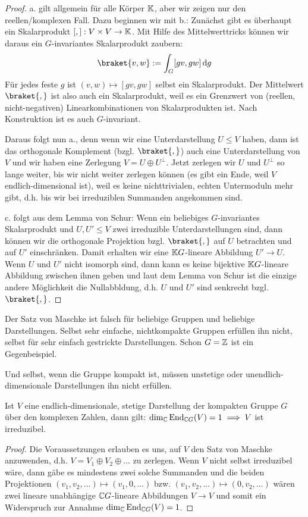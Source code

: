 \begin{proof}
a. gilt allgemein für alle Körper $\mathbb{K}$, aber wir zeigen nur den reellen/komplexen Fall. Dazu beginnen wir mit b.: Zunächst gibt es überhaupt ein Skalarprodukt $[,]: V\times V\to\mathbb{K}$. Mit Hilfe des Mittelwerttricks können wir daraus ein $G$-invariantes Skalarprodukt zaubern:
\[\braket{v,w} := \int_G [gv,gw] \dd g\]
Für jedes feste $g$ ist $(v,w) \mapsto [gv,gw]$ selbst ein Skalarprodukt. Der Mittelwert $\braket{,}$ ist also auch ein Skalarprodukt, weil es ein Grenzwert von (reellen, nicht-negativen) Linearkombinationen von Skalarprodukten ist. Nach Konstruktion ist es auch $G$-invariant.

\smallbreak
Daraus folgt nun a., denn wenn wir eine Unterdarstellung $U\leq V$ haben, dann ist das orthogonale Komplement (bzgl. $\braket{,}$) auch eine Unterdarstellung von $V$ und wir haben eine Zerlegung $V=U\oplus U^\perp$. Jetzt zerlegen wir $U$ und $U^\perp$ so lange weiter, bis wir nicht weiter zerlegen können (es gibt ein Ende, weil $V$ endlich-dimensional ist), weil es keine nichttrivialen, echten Untermoduln mehr gibt, d.h. bis wir bei irreduziblen Summanden angekommen sind.

\smallbreak
c. folgt aus dem Lemma von Schur: Wenn ein beliebiges $G$-invariantes Skalarprodukt und $U,U'\leq V$ zwei irreduzible Unterdarstellungen sind, dann können wir die orthogonale Projektion bzgl. $\braket{,}$ auf $U$ betrachten und auf $U'$ einschränken. Damit erhalten wir eine $\mathbb{K} G$-lineare Abbildung $U'\to U$. Wenn $U$ und $U'$ nicht isomorph sind, dann kann es keine bijektive $\mathbb{K} G$-lineare Abbildung zwischen ihnen geben und laut dem Lemma von Schur ist die einzige andere Möglichkeit die Nullabbldung, d.h. $U$ und $U'$ sind senkrecht bzgl. $\braket{,}$.
\end{proof}

\begin{remark}
Der Satz von Maschke ist falsch für beliebige Gruppen und beliebige Darstellungen. Selbst sehr einfache, nichtkompakte Gruppen erfüllen ihn nicht, selbst für sehr einfach gestrickte Darstellungen. Schon $G=\mathbb{Z}$ ist ein Gegenbeispiel.

Und selbst, wenn die Gruppe kompakt ist, müssen unstetige oder unendlich-dimensionale Darstellungen ihn nicht erfüllen.
\end{remark}

\begin{corollary}
Ist $V$ eine endlich-dimensionale, stetige Darstellung der kompakten Gruppe $G$ über den komplexen Zahlen, dann gilt: $\dim_{\mathbb{C}} \operatorname{End}_{\mathbb{C} G}(V) = 1 \implies V$ ist irreduzibel.
\end{corollary}
\begin{proof}
Die Voraussetzungen erlauben es uns, auf $V$ den Satz von Maschke anzuwenden, d.h. $V=V_1\oplus V_2\oplus ...$ zu zerlegen. Wenn $V$ nicht selbst irreduzibel wäre, dann gäbe es mindestens zwei solche Summanden und die beiden Projektionen $(v_1,v_2, ...) \mapsto (v_1,0,\ldots)$ bzw. $(v_1,v_2,\ldots)\mapsto (0,v_2,\ldots)$ wären zwei lineare unabhängige $\mathbb{C} G$-lineare Abbildungen $V\to V$ und somit ein Widerspruch zur Annahme $\dim_{\mathbb{C}} \operatorname{End}_{\mathbb{C} G}(V)=1$.
\end{proof}

